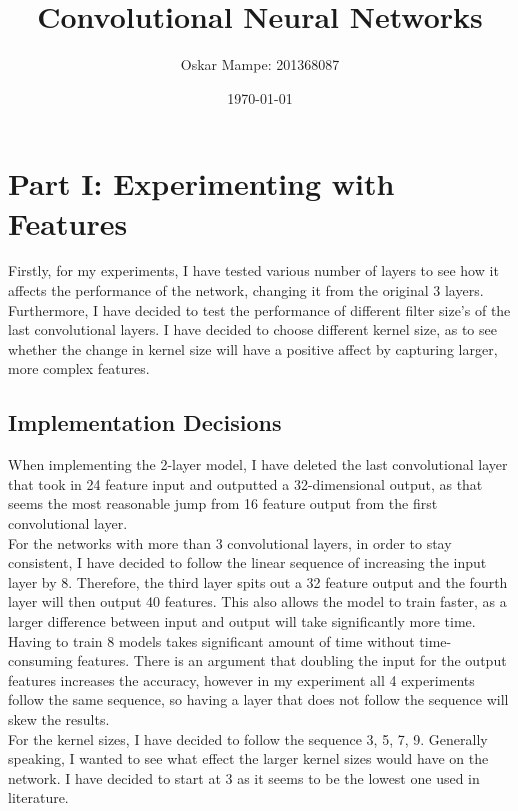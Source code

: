 \documentclass{article}
\author{Oskar Mampe: 201368087}
\date{\today}
\title{Convolutional Neural Networks}
\begin{document}
    \maketitle
    \tableofcontents

    \section{Part I: Experimenting with Features}


    Firstly, for my experiments, I have tested various number of layers to see how it affects the performance of the network, changing it from the original 3 layers. Furthermore, I have decided to test the performance of different filter size's of the last convolutional layers.  I have decided to choose different kernel size, as to see whether the change in kernel size will have a positive affect by capturing larger, more complex features.\\


    \subsection{Implementation Decisions}

    When implementing the 2-layer model, I have deleted the last convolutional layer that took in 24 feature input and outputted a 32-dimensional output, as that seems the most reasonable jump from 16 feature output from the first convolutional layer.\\

    For the networks with more than 3 convolutional layers, in order to stay consistent, I have decided to follow the linear sequence of increasing the input layer by 8. Therefore, the third layer spits out a 32 feature output and the fourth layer will then output 40 features. This also allows the model to train faster, as a larger difference between input and output will take significantly more time. Having to train 8 models takes significant amount of time without time-consuming features. There is an argument that doubling the input for the output features increases the accuracy, however in my experiment all 4 experiments follow the same sequence, so having a layer that does not follow the sequence will skew the results.\\

    For the kernel sizes, I have decided to follow the sequence 3, 5, 7, 9. Generally speaking, I wanted to see what effect the larger kernel sizes would have on the network. I have decided to start at 3 as it seems to be the lowest one used in literature.\\
\end{document}
